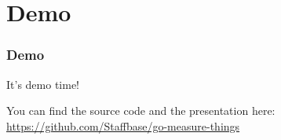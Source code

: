 \section{Demo}
\begin{frame}
  \frametitle{Demo} 
 
   \begin{block}{}
   {\huge It's demo time!}
  \end{block}
  
  You can find the source code and the presentation here: \url{https://github.com/Staffbase/go-measure-things}

\end{frame}
